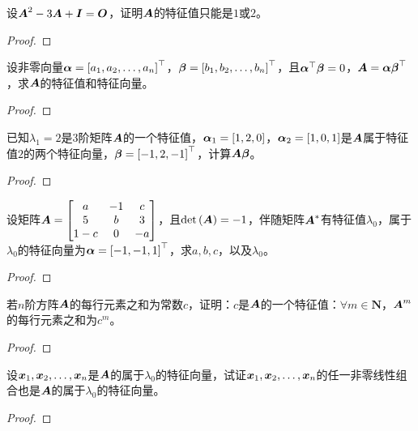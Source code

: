 \begin{problem}
设\(\boldsymbol{A}^2-3\boldsymbol{A}+\boldsymbol{I}=\boldsymbol{O}\)，证明\(\boldsymbol{A}\)的特征值只能是\(1\)或\(2\)。
\end{problem}
\begin{proof}

\end{proof}

\setcounter{problem}{11}
\begin{problem}
设非零向量\(\boldsymbol{\alpha}=\left[ {a}_1,{a}_2,\dots,{a}_{n} \right]^\top\)，\(\boldsymbol{\beta}=\left[ {b}_1,{b}_2,\dots,{b}_{n} \right]^\top\)，且\(\boldsymbol{\alpha}^\top\boldsymbol{\beta}=0\)，\(\boldsymbol{A}=\boldsymbol{\alpha}\boldsymbol{\beta}^\top\)，求\(\boldsymbol{A}\)的特征值和特征向量。
\end{problem}
\begin{proof}

\end{proof}

\begin{problem}
已知\(\lambda_1=2\)是\(3\)阶矩阵\(\boldsymbol{A}\)的一个特征值，\(\boldsymbol{\alpha}_1=\left[ 1,2,0 \right]\)，\(\boldsymbol{\alpha}_2=\left[ 1,0,1 \right]\)是\(\boldsymbol{A}\)属于特征值\(2\)的两个特征向量，\(\boldsymbol{\beta}=\left[ -1,2,-1 \right]^\top\)，计算\(\boldsymbol{A}\boldsymbol{\beta}\)。
\end{problem}
\begin{proof}

\end{proof}

\begin{problem}
设矩阵\(\boldsymbol{A}=\begin{bmatrix}a&-1&c\\5&b&3\\1-c&0&-a\end{bmatrix}\)，且\(\mathrm{det}\left( \boldsymbol{A} \right)=-1\)，伴随矩阵\(\boldsymbol{A}^*\)有特征值\(\lambda_0\)，属于\(\lambda_0\)的特征向量为\(\boldsymbol{\alpha}=\left[ -1,-1,1 \right]^\top\)，求\(a,b,c\)，以及\(\lambda_0\)。
\end{problem}
\begin{proof}

\end{proof}

\begin{problem}
若\(n\)阶方阵\(\boldsymbol{A}\)的每行元素之和为常数\(c\)，证明：\(c\)是\(\boldsymbol{A}\)的一个特征值：\(\forall m\in\mathbf{N}\)，\(\boldsymbol{A}^m\)的每行元素之和为\(c^m\)。
\end{problem}
\begin{proof}

\end{proof}

\setcounter{problem}{17}
\begin{problem}
设\({\boldsymbol{x}}_1,{\boldsymbol{x}}_2,\dots,{\boldsymbol{x}}_{n}\)是\(\boldsymbol{A}\)的属于\(\lambda_0\)的特征向量，试证\({\boldsymbol{x}}_1,{\boldsymbol{x}}_2,\dots,{\boldsymbol{x}}_{n}\)的任一非零线性组合也是\(\boldsymbol{A}\)的属于\(\lambda_0\)的特征向量。
\end{problem}
\begin{proof}

\end{proof}

